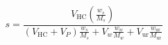 \[s = \frac{V_{\text{HC}}\left( \frac{w_{s}}{M_{s}} \right)}{\left( V_{\text{HC}} + V_{P} \right)\frac{w_{s}}{M_{s}} + V_{w}\frac{w_{w}}{M_{w}} + V_{\text{ur}}\frac{w_{\text{ur}}}{M_{\text{ur}}}}\]
